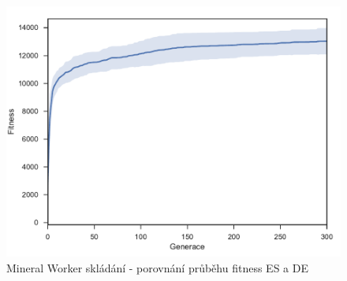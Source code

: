 \begin{figure}[t]\centering
	\includegraphics[width=\columnwidth]{../img/MineralMap/MineralWorkerPickup}
	\caption{Mineral Worker skládání - porovnání průběhu fitness ES a DE}
	\label{obr04:MineralWorkerStore}
\end{figure}
\clearpage
